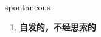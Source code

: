 
\begin{frame}
{\huge spontaneous}
\begin{center}
\begin{enumerate}\Large
  \item \textbf{自发的，不经思索的}
\end{enumerate}
\end{center}
\end{frame}

